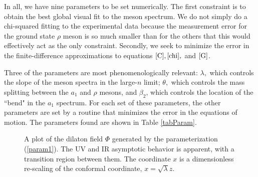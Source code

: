 \documentclass[12pt]{article}
\begin{document}
In all, we have nine parameters to be set numerically. 
The first constraint is to obtain the best global visual fit to the meson spectrum. 
We do not simply do a chi-squared fitting to the experimental data because the measurement error for the ground state $\rho$ meson is so much smaller than for the others that this would effectively act as the only constraint. 
Secondly, we seek to minimize the error in the finite-difference approximations to equations $\ref{C}, \ref{chi},$ and $\ref{G}$. 

Three of the parameters are most phenomenologically relevant: $\lambda,$ which controls the slope of the meson spectra in the large-$n$ limit; $\theta,$ which controls the mass splitting between the $a_1$ and $\rho$ mesons, and $\beta_2$, which controls the location of the ``bend" in the $a_1$ spectrum.
For each set of these parameters, the other parameters are set by a routine that minimizes the error in the equations of motion. 
The parameters found are shown in Table \ref{tabParam}.

\begin{figure}[htb]
\caption{A plot of the dilaton field $\Phi$ generated by the parameterization (\ref{param1}).
The UV and IR asymptotic behavior is apparent, with a transition region between them.
The coordinate $x$ is a dimensionless re-scaling of the conformal coordinate, $x=\sqrt{\lambda}z$.}
\label{figDilaton}
\end{figure}
\end{document}
